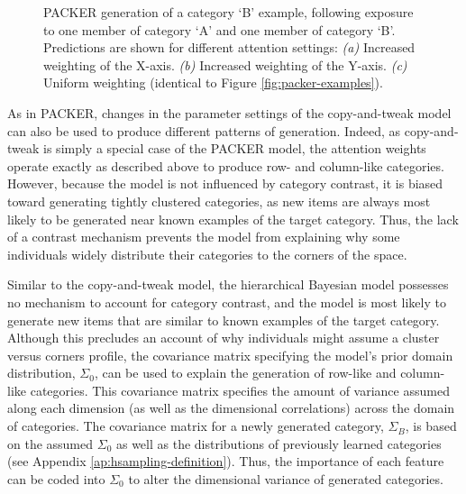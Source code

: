 \documentclass[12pt]{article}
\newcommand\inputpgf[2]{{
\let\pgfimageWithoutPath\pgfimage
\renewcommand{\pgfimage}[2][]{\pgfimageWithoutPath[##1]{#1/##2}}

}}
\begin{document}
\begin{flushleft}
\begin{figure}
    \begin{center}
    \inputpgf{figs/}{packer-attention-examples.pgf}
    \caption{PACKER generation of a category `B' example, following exposure to one member of category `A' and one member of category `B'. Predictions are shown for different attention settings: {\em (a)} Increased weighting of the X-axis. {\em (b)} Increased weighting of the Y-axis. {\em (c)} Uniform weighting (identical to Figure \ref{fig:packer-examples}).}
    \label{fig:packer-attention}
    \end{center}
\end{figure}

As in PACKER, changes in the parameter settings of the copy-and-tweak model can also be used to produce different patterns of generation. Indeed, as copy-and-tweak is simply a special case of the PACKER model, the attention weights operate exactly as described above to produce row- and column-like categories. However, because the model is not influenced by category contrast, it is biased toward generating tightly clustered categories, as new items are always most likely to be generated near known examples of the target category. Thus, the lack of a contrast mechanism prevents the model from explaining why some individuals widely distribute their categories to the corners of the space.

Similar to the copy-and-tweak model, the hierarchical Bayesian model possesses no mechanism to account for category contrast, and the model is most likely to generate new items that are similar to known examples of the target category. Although this precludes an account of why individuals might assume a cluster versus corners profile, the covariance matrix specifying the model's prior domain distribution, $\Sigma_0$, can be used to explain the generation of row-like and column-like categories. This covariance matrix specifies the amount of variance assumed along each dimension (as well as the dimensional correlations) across the domain of categories. The covariance matrix for a newly generated category, $\Sigma_B$, is based on the assumed $\Sigma_0$ as well as the distributions of previously learned categories (see Appendix \ref{ap:hsampling-definition}). Thus, the importance of each feature can be coded into $\Sigma_0$ to alter the dimensional variance of generated categories.


\end{flushleft}
\end{document}
